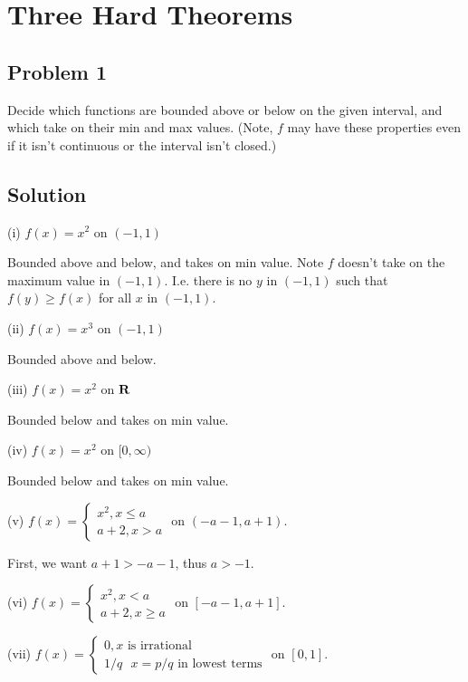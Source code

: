 \section{Three Hard Theorems}

\subsection*{Problem 1}
Decide which functions are bounded above or below on the given
interval, and which take on their min and max values. (Note, $f$ may
have these properties even if it isn't continuous or the interval
isn't closed.)

\subsection*{Solution}

(i) $f(x)=x^{2}$ on $(-1,1)$

Bounded above and below, and takes on min value. Note $f$ doesn't take
on the maximum value in $(-1,1)$. I.e. there is no $y$ in $(-1,1)$
such that $f(y)\geq f(x)$ for all $x$ in $(-1,1)$.

\vs

(ii) $f(x)=x^{3}$ on $(-1,1)$

Bounded above and below.

\vs

(iii) $f(x)=x^{2}$ on $\mathbf{R}$

Bounded below and takes on min value.

\vs

(iv) $f(x)=x^{2}$ on $[0, \infty)$

Bounded below and takes on min value.

\vs

(v) $f(x)=\begin{cases}
  x^{2}, x\leq a\\
  a+2, x>a
\end{cases}$ on $(-a-1, a+1)$.

First, we want $a+1>-a-1$, thus $a>-1$.

\vs

(vi) $f(x)=\begin{cases}
  x^{2}, x<a\\
  a+2, x\geq a
\end{cases}$ on $[-a-1, a+1]$.

\vs

(vii) $f(x)=\begin{cases}
  0, \text{$x$ is irrational}\\
  1/q \ \ \ x=p/q \text{ in lowest terms}
\end{cases}$ on $[0, 1]$.

